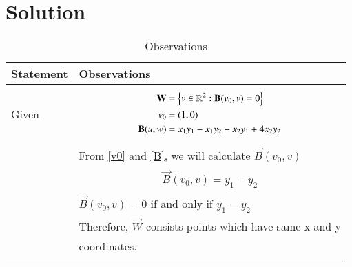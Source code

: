 \documentclass[journal,12pt]{IEEEtran}
\begin{document}
\section{\textbf{Solution}}
\renewcommand{\thetable}{2}
\begin{longtable}{|l|l|}
\hline
\endhead
\textbf{Statement}&\textbf{Observations}\\
\hline
Given&\parbox{10cm}{\begin{align}
    \mathbf{W}&=\left\{v\in\mathbb{R}^2:\mathbf{B}(v_0,v)=0\right\}\label{W}\\
    v_0&=(1,0)\label{v0}\\
    \mathbf{B}(u,w)&=x_1y_1-x_1y_2-x_2y_1+4x_2y_2\label{B}
\end{align}}\\&From \eqref{v0} and \eqref{B}, we will calculate $\vec{B}(v_0,v)$\\&\parbox{10cm}{\begin{align}
    \vec{B}(v_0,v)=y_1-y_2\label{Bv0}
\end{align}}\\&$\vec{B}(v_0,v)=0$ if and only if $y_1=y_2$\\&Therefore, $\vec{W}$ consists points which have same x and y\\&coordinates.\\
\hline
\caption{Observations}
\label{obs}
\end{longtable}
\renewcommand{\thetable}{3}
\end{document}
